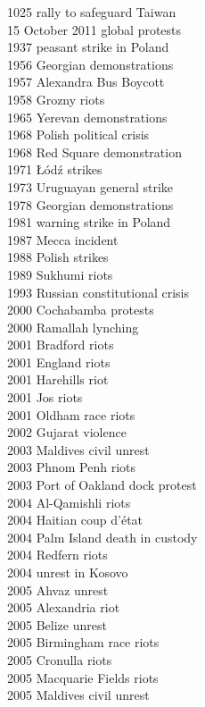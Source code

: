 1025 rally to safeguard Taiwan\\
15 October 2011 global protests\\
1937 peasant strike in Poland\\
1956 Georgian demonstrations\\
1957 Alexandra Bus Boycott\\
1958 Grozny riots\\
1965 Yerevan demonstrations\\
1968 Polish political crisis\\
1968 Red Square demonstration\\
1971 Łódź strikes\\
1973 Uruguayan general strike\\
1978 Georgian demonstrations\\
1981 warning strike in Poland\\
1987 Mecca incident\\
1988 Polish strikes\\
1989 Sukhumi riots\\
1993 Russian constitutional crisis\\
2000 Cochabamba protests\\
2000 Ramallah lynching\\
2001 Bradford riots\\
2001 England riots\\
2001 Harehills riot\\
2001 Jos riots\\
2001 Oldham race riots\\
2002 Gujarat violence\\
2003 Maldives civil unrest\\
2003 Phnom Penh riots\\
2003 Port of Oakland dock protest\\
2004 Al-Qamishli riots\\
2004 Haitian coup d'état\\
2004 Palm Island death in custody\\
2004 Redfern riots\\
2004 unrest in Kosovo\\
2005 Ahvaz unrest\\
2005 Alexandria riot\\
2005 Belize unrest\\
2005 Birmingham race riots\\
2005 Cronulla riots\\
2005 Macquarie Fields riots\\
2005 Maldives civil unrest\\
